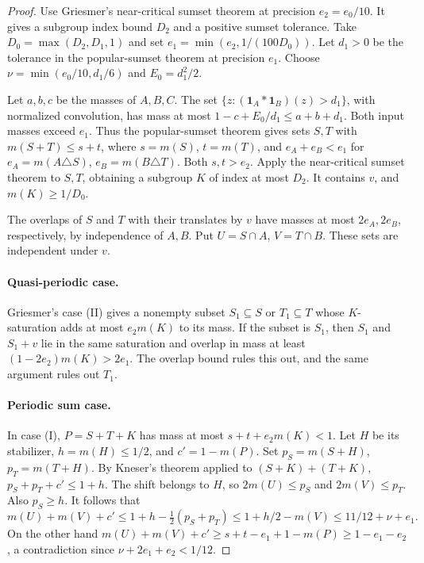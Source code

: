 \documentclass[11pt,reqno]{amsart}
\newcommand{\ind}{\mathbf 1}
\numberwithin{equation}{section}
\begin{document}
\begin{proof}
Use Griesmer's near-critical sumset theorem
\cite[Theorem~1.15]{griesmer} at precision \(e_2=e_0/10\).
It gives a subgroup index bound \(D_2\) and a positive sumset
tolerance. Take \(D_0=\max(D_2,D_1,1)\) and set
\(e_1=\min(e_2,1/(100D_0))\). Let \(d_1>0\) be the
tolerance in the popular-sumset theorem \cite[Theorem~1.1]{griesmer}
at precision \(e_1\). Choose \(\nu=\min(e_0/10,d_1/6)\) and
\(E_0=d_1^2/2\).

Let \(a,b,c\) be the masses of \(A,B,C\).
The set \(\{z:(\ind_A*\ind_B)(z)>d_1\}\), with normalized
convolution, has mass at most \(1-c+E_0/d_1\le a+b+d_1\).
Both input masses exceed \(e_1\). Thus the popular-sumset theorem
gives sets \(S,T\) with
\(m(S+T)\le s+t\), where \(s=m(S)\), \(t=m(T)\), and
\(e_A+e_B<e_1\) for \(e_A=m(A\triangle S)\),
\(e_B=m(B\triangle T)\). Both \(s,t>e_2\). Apply the near-critical
sumset theorem to \(S,T\), obtaining a subgroup \(K\) of index
at most \(D_2\). It contains \(v\), and \(m(K)\ge1/D_0\).

The overlaps of \(S\) and \(T\) with their translates by \(v\)
have masses at most \(2e_A,2e_B\), respectively, by independence
of \(A,B\). Put \(U=S\cap A\), \(V=T\cap B\).
These sets are independent under \(v\).

\paragraph{Quasi-periodic case.}
Griesmer's case (II) gives a nonempty subset \(S_1\subseteq S\)
or \(T_1\subseteq T\) whose \(K\)-saturation adds at most
\(e_2m(K)\) to its mass. If the subset is \(S_1\), then \(S_1\)
and \(S_1+v\) lie in the same saturation and overlap in mass
at least \((1-2e_2)m(K)>2e_1\). The overlap bound rules this out,
and the same argument rules out \(T_1\).

\paragraph{Periodic sum case.}
In case (I), \(P=S+T+K\) has mass at most
\(s+t+e_2m(K)<1\). Let \(H\) be its stabilizer, \(h=m(H)\le1/2\),
and \(c'=1-m(P)\). Set \(p_S=m(S+H)\), \(p_T=m(T+H)\).
By Kneser's theorem applied to \((S+K)+(T+K)\),
\(p_S+p_T+c'\le1+h\). The shift belongs to \(H\), so
\(2m(U)\le p_S\) and \(2m(V)\le p_T\). Also \(p_S\ge h\).
It follows that
\[
 m(U)+m(V)+c'
 \le 1+h-\tfrac12(p_S+p_T)\le 1+h/2-m(V)
 \le 11/12+\nu+e_1 .
\]
On the other hand \(m(U)+m(V)+c'\ge s+t-e_1+1-m(P)
\ge1-e_1-e_2\), a contradiction since
\(\nu+2e_1+e_2<1/12\).


\end{proof}
\end{document}
